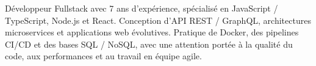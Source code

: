 \par{
Développeur Fullstack avec 7 ans d'expérience, spécialisé en JavaScript / TypeScript, Node.js et React. Conception d'API REST / GraphQL, architectures microservices et applications web évolutives. Pratique de Docker, des pipelines CI/CD et des bases SQL / NoSQL, avec une attention portée à la qualité du code, aux performances et au travail en équipe agile.
}
